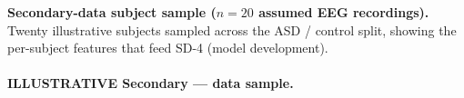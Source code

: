\noindent\textbf{Secondary-data subject sample ($n{=}20$ assumed EEG recordings).} Twenty illustrative subjects sampled across the ASD / control split, showing the per-subject features that feed SD-4 (model development).

\noindent{}\vspace{4pt}

\paragraph{ILLUSTRATIVE Secondary --- data sample.}
